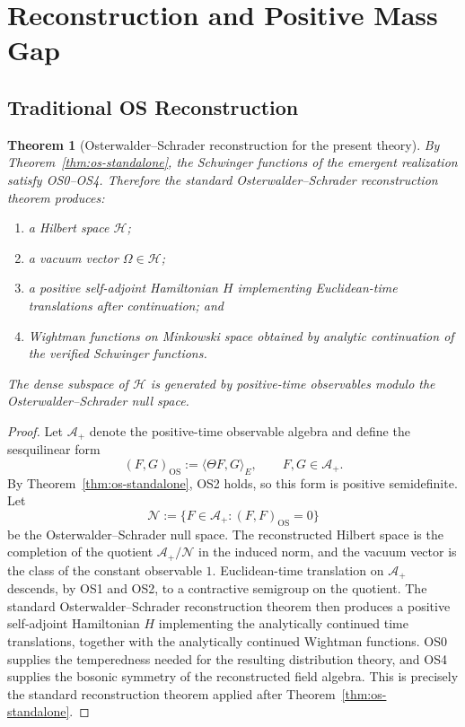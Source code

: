 \documentclass[11pt]{article}
\newtheorem{theorem}{Theorem}[section]
\theoremstyle{definition}
\theoremstyle{remark}
\newcommand{\mcA}{\mathcal A}
\newcommand{\mcH}{\mathcal H}
\newcommand{\mcN}{\mathcal N}
\begin{document}
\section{Reconstruction and Positive Mass Gap}
\label{sec:reconstruction}

\subsection{Traditional OS Reconstruction}

\begin{theorem}[Osterwalder--Schrader reconstruction for the present theory]
\label{thm:os-reconstruction-standard}
By Theorem~\ref{thm:os-standalone}, the Schwinger functions of the emergent
realization satisfy OS0--OS4.  Therefore the standard
Osterwalder--Schrader reconstruction theorem \cite{os} produces:
\begin{enumerate}[label=\textnormal{(\roman*)},leftmargin=1.5em]
\item a Hilbert space $\mcH$;
\item a vacuum vector $\Omega\in\mcH$;
\item a positive self-adjoint Hamiltonian $H$ implementing Euclidean-time
translations after continuation; and
\item Wightman functions on Minkowski space obtained by analytic continuation of
the verified Schwinger functions.
\end{enumerate}
The dense subspace of $\mcH$ is generated by positive-time observables modulo
the Osterwalder--Schrader null space.
\end{theorem}

\begin{proof}
Let $\mcA_+$ denote the positive-time observable algebra and define the
sesquilinear form
\[
(F,G)_{\mathrm{OS}}:=\langle \Theta F,G\rangle_E,
\qquad F,G\in\mcA_+.
\]
By Theorem~\ref{thm:os-standalone}, OS2 holds, so this form is positive
semidefinite.  Let
\[
\mcN:=\{F\in\mcA_+:(F,F)_{\mathrm{OS}}=0\}
\]
be the Osterwalder--Schrader null space.  The reconstructed Hilbert space is
the completion of the quotient $\mcA_+/\mcN$ in the induced norm, and the vacuum
vector is the class of the constant observable $1$.  Euclidean-time translation
on $\mcA_+$ descends, by OS1 and OS2, to a contractive semigroup on the
quotient.  The standard Osterwalder--Schrader reconstruction theorem then
produces a positive self-adjoint Hamiltonian $H$ implementing the analytically
continued time translations, together with the analytically continued Wightman
functions.  OS0 supplies the temperedness needed for the resulting distribution
theory, and OS4 supplies the bosonic symmetry of the reconstructed field
algebra.  This is precisely the standard reconstruction theorem applied after
Theorem~\ref{thm:os-standalone}.
\end{proof}
\end{document}
